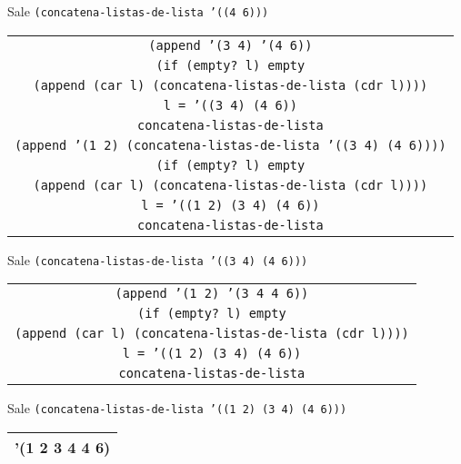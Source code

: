 \documentclass[letterpaper,11pt]{article}
\begin{document}
\begin{enumerate}
\begin{enumerate}
        Sale \texttt{(concatena-listas-de-lista '((4 6)))}
        \begin{center}
            \begin{tabular}{|c|}
                \hline
                \texttt{(append '(3 4) '(4 6))}  \\
                \texttt{(if (empty? l) empty} \\
                \texttt{(append (car l) (concatena-listas-de-lista (cdr l))))} \\
                \texttt{l = '((3 4) (4 6))} \\
                \texttt{concatena-listas-de-lista} \\
                \hline
                \hline
                \texttt{(append '(1 2) 
                (concatena-listas-de-lista '((3 4) (4 6))))}  \\
                \texttt{(if (empty? l) empty} \\
                \texttt{(append (car l) (concatena-listas-de-lista (cdr l))))} \\
                \texttt{l = '((1 2) (3 4) (4 6))} \\
                \texttt{concatena-listas-de-lista} \\
                \hline
            \end{tabular}
        \end{center}

        Sale \texttt{(concatena-listas-de-lista '((3 4) (4 6)))}
        \begin{center}
            \begin{tabular}{|c|}
                \hline
                \texttt{(append '(1 2) '(3 4 4 6))}  \\
                \texttt{(if (empty? l) empty} \\
                \texttt{(append (car l) (concatena-listas-de-lista (cdr l))))} \\
                \texttt{l = '((1 2) (3 4) (4 6))} \\
                \texttt{concatena-listas-de-lista} \\
                \hline
            \end{tabular}
        \end{center}

        Sale \texttt{(concatena-listas-de-lista '((1 2) (3 4) (4 6)))}
        \begin{center}
            \begin{tabular}{|c|}
                \hline
                '(1 2 3 4 4 6) \\
                \hline
            \end{tabular}
        \end{center}


\end{enumerate}
\end{enumerate}
\end{document}
